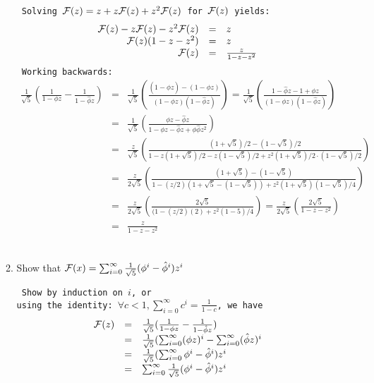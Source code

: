 \begin{enumerate}
\begin{enumerate}
{\tt
Solving ${\cal F}(z) = z + z{\cal F}(z) + z^2 {\cal F}(z)$
for ${\cal F}(z)$ yields:
$$
\begin{array}{rcl}
{\cal F}(z) - z{\cal F}(z) - z^2 {\cal F}(z) &=& z\\
{\cal F}(z)(1 - z - z^2) &=& z\\
{\cal F}(z) &=& \frac{z}{1 - z - z^2}
\end{array}
$$
Working backwards:
$$
\begin{array}{rcl}
    \frac{1}{\sqrt{5}} ( \frac{1}{1-\phi z} -	\frac{1}{1-\hat\phi z})
     &=& \frac{1}{\sqrt{5}} ( \frac{(1-\hat\phi z) - (1-\phi z)}
			{(1-\phi z)(1-\hat\phi z)})
     = \frac{1}{\sqrt{5}} ( \frac{1-\hat\phi z - 1+\phi z}
			{(1-\phi z)(1-\hat\phi z)})\\
     &=& \frac{1}{\sqrt{5}} ( \frac{\phi z - \hat\phi z}
			{1-\phi z-\hat\phi z + \phi \hat\phi z^2})\\
     &=& \frac{z}{\sqrt{5}} ( \frac{{(1+\sqrt{5})}/{2}  
		- (1-\sqrt{5})/{2}}
		{1-z(1+\sqrt{5})/{2} - z(1-\sqrt{5})/{2}
		+ z^2(1+\sqrt{5})/{2}\cdot (1-\sqrt{5})/{2}})\\
     &=& \frac{z}{2\sqrt{5}} ( \frac{{(1+\sqrt{5})}  - (1-\sqrt{5})}
		{1-(z/2)(1+\sqrt{5}-(1-\sqrt{5}))
		+ z^2(1+\sqrt{5})(1-\sqrt{5})/4})\\
     &=& \frac{z}{2\sqrt{5}} ( \frac{2\sqrt{5}}
		{(1-(z/2)(2)
		+ z^2(1-5)/4})
     = \frac{z}{2\sqrt{5}} ( \frac{2\sqrt{5}}
		{1-z - z^2})\\
     &=& \frac{z}{1-z- z^2}\\
\end{array}
$$
}
    	    \item Show that 
		${\cal F}(x) = \sum_{i=0}^{\infty} \frac{1}{\sqrt{5}}
			(\phi^i -\hat\phi^i)z^i
		$

{\tt
Show by induction on $i$, or \\
using the identity: $\forall c < 1, \sum_{i=0}^{\infty} c^i = \frac{1}{1-c}$, 
we have
$$
\begin{array}{rcl}
    {\cal F}(z)
    	& = & \frac{1}{\sqrt{5}}(\frac{1}{1-\phi z} -\frac{1}{1-\hat\phi z})\\
    	& = & \frac{1}{\sqrt{5}}( \sum_{i=0}^{\infty} (\phi z)^i 
		- \sum_{i=0}^{\infty} (\hat\phi z)^i \\
    	& = & \frac{1}{\sqrt{5}}( \sum_{i=0}^{\infty} \phi^i - \hat\phi^i)z^i\\
    	& = & \sum_{i=0}^{\infty} \frac{1}{\sqrt{5}}(\phi^i - \hat\phi^i)z^i
\end{array}
$$
}
	\end{enumerate}


\end{enumerate}
